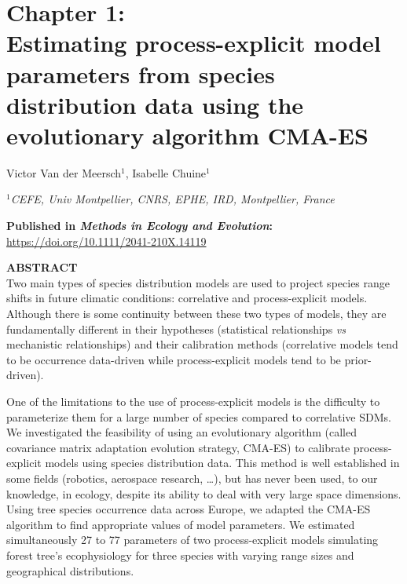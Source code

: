 
\section{Chapter 1:\\ Estimating process-explicit model parameters from species distribution data using the evolutionary algorithm CMA-ES}

\vspace*{1cm}
\sffamily
\large
\begin{center}
Victor Van der Meersch$^1$, Isabelle Chuine$^1$

\vspace*{0.1cm}
\small
\emph{$^1$CEFE, Univ Montpellier, CNRS, EPHE, IRD, Montpellier, France}
\end{center}

\vspace*{0.7cm}
\normalsize
\textbf{Published in \emph{Methods in Ecology and Evolution}:\\} \url{https://doi.org/10.1111/2041-210X.14119}

\vspace*{1cm}

\textbf{ABSTRACT}\\
Two main types of species distribution models are used to project
species range shifts in future climatic conditions: correlative and
process-explicit models. Although there is some continuity between these
two types of models, they are fundamentally different in their
hypotheses (statistical relationships \emph{vs} mechanistic
relationships) and their calibration methods (correlative models tend to be
occurrence data-driven while process-explicit models tend to be prior-driven).

One of the limitations to the use of process-explicit models is the
difficulty to parameterize them for a large number of species compared
to correlative SDMs. We investigated the feasibility of using an
evolutionary algorithm (called covariance matrix adaptation evolution
strategy, CMA-ES) to calibrate process-explicit models using species
distribution data. This method is well established in some fields
(robotics, aerospace research, \ldots), but has never been used, to
our knowledge, in ecology, despite its ability to deal with very large
space dimensions. Using tree species occurrence data across Europe, we
adapted the CMA-ES algorithm to find appropriate values of model
parameters. We estimated simultaneously 27 to 77 parameters of two
process-explicit models simulating forest tree's ecophysiology for three
species with varying range sizes and geographical distributions.

